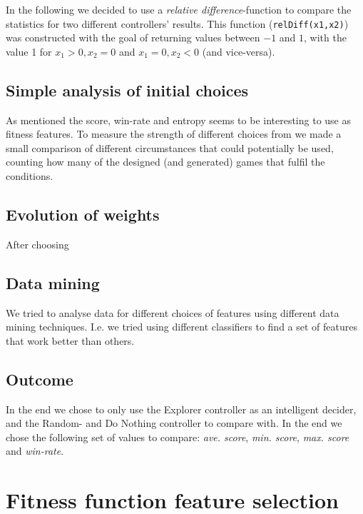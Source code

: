 \documentclass[a4paper,titlepage,final]{report}
\begin{document}
In the following we decided to use a \textit{relative difference}-function to compare the  statistics for two different controllers' results.
This function (\texttt{relDiff(x1,x2)}) was constructed with the goal of returning values between $-1$ and $1$, with the value 1 for $x_1 > 0, x_2 = 0$ and $x_1 = 0, x_2 < 0$ (and vice-versa).

\subsection{Simple analysis of initial choices}
As mentioned the score, win-rate and entropy seems to be interesting to use as fitness features.
To measure the strength of different choices from we made a small comparison of different circumstances that could potentially be used, counting how many of the designed (and generated) games that fulfil the conditions.




\subsection{Evolution of weights}
After choosing 


\subsection{Data mining}
We tried to analyse data for different choices of features using different data mining techniques. I.e. we tried using different classifiers to find a set of features that work better than others.


\subsection{Outcome}

In the end we chose to only use the Explorer controller as an intelligent decider, and the Random- and Do Nothing controller to compare with.
In the end we chose the following set of values to compare: \textit{ave. score},  \textit{min. score}, \textit{max. score} and \textit{win-rate}.








\section{Fitness function feature selection}
\end{document}
